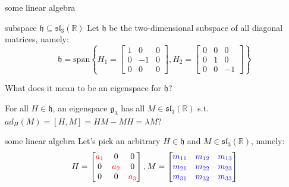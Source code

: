 \documentclass{beamer}
\newcommand{\R}{\mathbb{R}}
\newcounter{mytheorem}[section] \def\themytheorem{\thesection.\arabic{mytheorem}}
\begin{document}
\addtocounter{mytheorem}{-1}
\begin{frame}{some linear algebra}
	\begin{defn}{subspace $\mathfrak{h} \subseteq \mathfrak{sl}_3(\R)$}{}
		Let  $\mathfrak{h}$ be the two-dimensional subspace of all diagonal matrices, namely:  \[
			\mathfrak{h} = \text{span}{\left\{ H_1 = \begin{bmatrix} 1 & 0 &0 \\ 0 & -1 & 0 \\ 0 &0 &0 \end{bmatrix}, H_2 = \begin{bmatrix} 0 &0 &0 \\ 0 &1&0 \\ 0&0&-1 \end{bmatrix}   \right\} }
		\] 
	\end{defn}
	What does it mean to be an eigenspace for $\mathfrak{h}$?

	For all $H \in \mathfrak{h}$, an eigenspace $\mathfrak{g}_{\lambda}$ has all $M \in \mathfrak{sl}_{3}(\R)$ s.t. $ad_{H}(M) = [H,M] = HM-MH = \lambda M?$
\end{frame}


\begin{frame}{some linear algebra}
	Let's pick an arbitrary $H \in \mathfrak{h}$ and $M \in \mathfrak{sl}_3(\R)$, namely: \[
		H = \def\a{\color{red}a} \begin{bmatrix} \a_1 & 0 & 0 \\ 0 & \a_2 &0 \\ 0 &0 &\a_3 \end{bmatrix}, M = \def\m{\color{blue}m} \begin{bmatrix} \m_{11} & \m_{12} & \m_{13} \\ \m_{21} & \m_{22} & \m_{23} \\ \m_{31} & \m_{32} & \m_{33} \end{bmatrix} 
	\] 
\end{frame}
\end{document}
